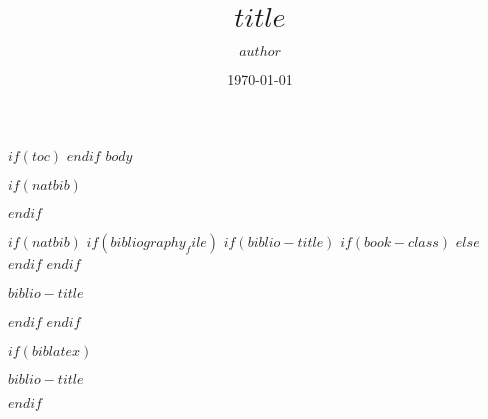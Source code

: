 \documentclass[$for(classoption)$$classoption$$sep$,$endfor$]{$documentclass$}
\title{$title$}
\author{$author$}
\date{\$date$}
\date{\today}
\institute{$institute$}
\institute{Chair of Systems Design}
\begin{document}
\frame{
\maketitle
}
\note{}

$if(toc)$
$endif$
$body$

$if(natbib)$

$endif$

$if(natbib)$
  $if(bibliography_file)$
    $if(biblio-title)$
      $if(book-class)$
        \renewcommand\bibname{$biblio-title$}
      $else$
        \renewcommand\refname{$biblio-title$}
      $endif$
    $endif$
   \begin{frame}[allowframebreaks]{$biblio-title$}
   
   \end{frame}
  $endif$
$endif$

$if(biblatex)$
\begin{frame}[allowframebreaks]{$biblio-title$}
\printbibliography[heading=none]
\end{frame}
$endif$
\end{document}
